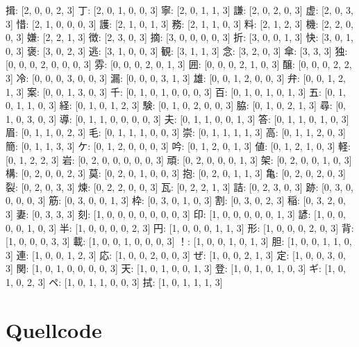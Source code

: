 \documentclass[a4paper,10pt,ngerman]{scrartcl}
\begin{document}
揖: [2, 0, 0, 2, 3]
丁: [2, 0, 1, 0, 0, 3]
寧: [2, 0, 1, 1, 3]
謙: [2, 0, 2, 0, 3]
虚: [2, 0, 3, 3]
惜: [2, 1, 0, 0, 0, 3]
護: [2, 1, 0, 1, 3]
務: [2, 1, 1, 0, 3]
料: [2, 1, 2, 3]
機: [2, 2, 0, 0, 3]
嫌: [2, 2, 1, 3]
徴: [2, 3, 0, 3]
摘: [3, 0, 0, 0, 0, 3]
折: [3, 0, 0, 1, 3]
快: [3, 0, 1, 0, 3]
褒: [3, 0, 2, 3]
逃: [3, 1, 0, 0, 3]
観: [3, 1, 1, 3]
念: [3, 2, 0, 3]
傘: [3, 3, 3]
独: [0, 0, 0, 2, 0, 0, 0, 3]
雰: [0, 0, 0, 2, 0, 1, 3]
囲: [0, 0, 0, 2, 1, 0, 3]
醸: [0, 0, 0, 2, 2, 3]
冷: [0, 0, 0, 3, 0, 0, 3]
漏: [0, 0, 0, 3, 1, 3]
雄: [0, 0, 1, 2, 0, 0, 3]
弁: [0, 0, 1, 2, 1, 3]
案: [0, 0, 1, 3, 0, 3]
千: [0, 1, 0, 1, 0, 0, 0, 3]
百: [0, 1, 0, 1, 0, 1, 3]
五: [0, 1, 0, 1, 1, 0, 3]
経: [0, 1, 0, 1, 2, 3]
験: [0, 1, 0, 2, 0, 0, 3]
脇: [0, 1, 0, 2, 1, 3]
尋: [0, 1, 0, 3, 0, 3]
導: [0, 1, 1, 0, 0, 0, 0, 3]
夫: [0, 1, 1, 0, 0, 1, 3]
答: [0, 1, 1, 0, 1, 0, 3]
眉: [0, 1, 1, 0, 2, 3]
毛: [0, 1, 1, 1, 0, 0, 3]
崇: [0, 1, 1, 1, 1, 3]
高: [0, 1, 1, 2, 0, 3]
簡: [0, 1, 1, 3, 3]
ケ: [0, 1, 2, 0, 0, 0, 3]
吟: [0, 1, 2, 0, 1, 3]
値: [0, 1, 2, 1, 0, 3]
軽: [0, 1, 2, 2, 3]
岩: [0, 2, 0, 0, 0, 0, 0, 3]
頑: [0, 2, 0, 0, 0, 1, 3]
架: [0, 2, 0, 0, 1, 0, 3]
構: [0, 2, 0, 0, 2, 3]
莫: [0, 2, 0, 1, 0, 0, 3]
抱: [0, 2, 0, 1, 1, 3]
亀: [0, 2, 0, 2, 0, 3]
裂: [0, 2, 0, 3, 3]
煉: [0, 2, 2, 0, 0, 3]
瓦: [0, 2, 2, 1, 3]
詰: [0, 2, 3, 0, 3]
跡: [0, 3, 0, 0, 0, 0, 3]
筋: [0, 3, 0, 0, 1, 3]
枠: [0, 3, 0, 1, 0, 3]
割: [0, 3, 0, 2, 3]
稲: [0, 3, 2, 0, 3]
妻: [0, 3, 3, 3]
刻: [1, 0, 0, 0, 0, 0, 0, 0, 3]
印: [1, 0, 0, 0, 0, 0, 1, 3]
諺: [1, 0, 0, 0, 0, 1, 0, 3]
半: [1, 0, 0, 0, 0, 2, 3]
円: [1, 0, 0, 0, 1, 1, 3]
形: [1, 0, 0, 0, 2, 0, 3]
背: [1, 0, 0, 0, 3, 3]
載: [1, 0, 0, 1, 0, 0, 0, 3]
！: [1, 0, 0, 1, 0, 1, 3]
胆: [1, 0, 0, 1, 1, 0, 3]
連: [1, 0, 0, 1, 2, 3]
応: [1, 0, 0, 2, 0, 0, 3]
ぜ: [1, 0, 0, 2, 1, 3]
定: [1, 0, 0, 3, 0, 3]
関: [1, 0, 1, 0, 0, 0, 0, 3]
天: [1, 0, 1, 0, 0, 1, 3]
登: [1, 0, 1, 0, 1, 0, 3]
ギ: [1, 0, 1, 0, 2, 3]
ペ: [1, 0, 1, 1, 0, 0, 3]
拭: [1, 0, 1, 1, 1, 3]


\section{Quellcode}
\end{document}
